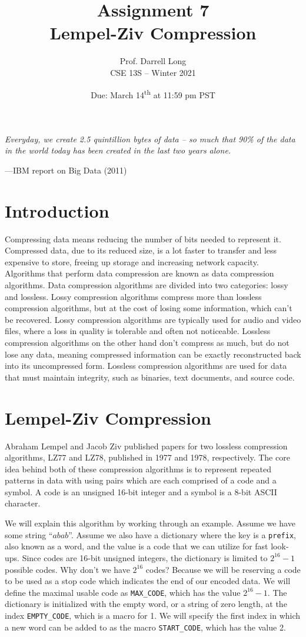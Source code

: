 \documentclass{article}
\title{Assignment 7 \\ Lempel-Ziv Compression}
\author{Prof. Darrell Long \\
CSE 13S -- Winter 2021}
\date{Due: March 14\textsuperscript{th} at 11:59 pm PST}
\begin{document}
\maketitle

\textwidth
\epigraph{\emph{Everyday, we create 2.5 quintillion bytes of data -- so much
that 90\% of the data in the world today has been created in the last two years
alone.}}{---IBM report on Big Data (2011)}

\section{Introduction}
Compressing data means reducing the number of bits needed to represent it.
Compressed data, due to its reduced size, is a lot faster to transfer and less
expensive to store, freeing up storage and increasing network capacity.
Algorithms that perform data compression are known as data compression
algorithms. Data compression algorithms are divided into two categories: lossy
and lossless.  Lossy compression algorithms compress more than lossless
compression algorithms, but at the cost of losing some information, which can't
be recovered. Lossy compression algorithms are typically used for audio and
video files, where a loss in quality is tolerable and often not noticeable.
Lossless compression algorithms on the other hand don't compress as much, but do
not lose any data, meaning compressed information can be exactly reconstructed
back into its uncompressed form. Lossless compression algorithms are used for
data that must maintain integrity, such as binaries, text documents, and source
code.

\section{Lempel-Ziv Compression}
Abraham Lempel and Jacob Ziv published papers for two lossless compression
algorithms, LZ77 and LZ78, published in 1977 and 1978, respectively. The core
idea behind both of these compression algorithms is to represent repeated
patterns in data with using pairs which are each comprised of a code and a
symbol. A code is an unsigned 16-bit integer and a symbol is a 8-bit ASCII
character.

We will explain this algorithm by working through an example.
Assume we have some string ``$abab$''. Assume we also have a
dictionary where the key is a \texttt{prefix}, also known as a word, and the value is a
code that we can utilize for fast look-ups. Since codes are 16-bit unsigned
integers, the dictionary is limited to $2^{16} - 1$ possible codes.
Why don't we have $2^{16}$ codes? Because we will be reserving a code to be used
as a stop code which indicates the end of our encoded data. We will define the
maximal usable code as \texttt{MAX\_CODE}, which has the value $2^{16} - 1$. The
dictionary is initialized with the empty word, or a string of zero length, at
the index \texttt{EMPTY\_CODE}, which is a macro for 1. We will specify the
first index in which a new word can be added to as the macro
\texttt{START\_CODE}, which has the value 2.
\end{document}
